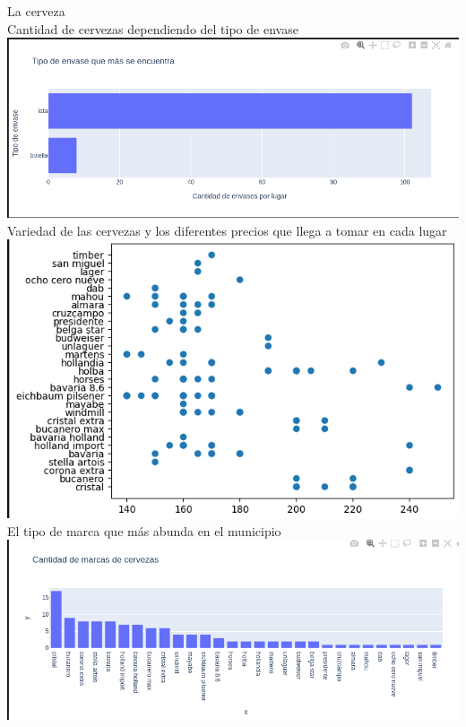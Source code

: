 \documentclass{report}
\begin{document}
    \newpage
    \centering
    {\Huge La cerveza}\\
    \vspace{2cm}
    Cantidad de cervezas dependiendo del tipo de envase\\
    \vspace{1cm}
    \includegraphics[width= 1.0\textwidth]{envase}\\
    \vspace{1cm}
    Variedad de las cervezas y los diferentes precios que llega a tomar en cada lugar\\
    \vspace{1cm}
    \includegraphics[width= 1.0\textwidth]{cerveza}\\

    \newpage
    \centering
    El tipo de marca que más abunda en el municipio\\
    \vspace{1cm}
    \includegraphics[width= 1.0\textwidth]{+abunda}\\
    
\end{document}
